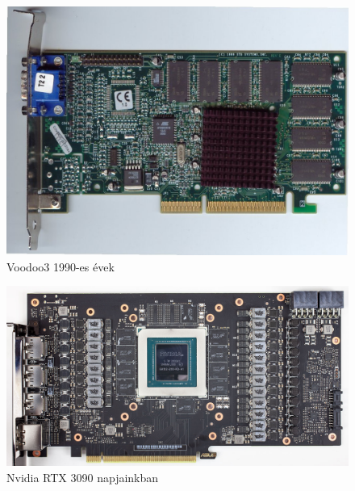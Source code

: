 \documentclass[tikz,border=10pt]{beamer}
\begin{document}
\begin{frame}
\begin{columns}[onlytextwidth]
\begin{column}{0.5\textwidth}
\begin{figure}
\includegraphics[scale=.15]{media/Voodoo3.jpg}
\caption{Voodoo3 1990-es évek}
\end{figure}

\begin{figure}
\includegraphics[scale=.078]{media/3080.jpg}
\caption{Nvidia RTX 3090 napjainkban}
\end{figure}

\end{column}
\end{columns}
\end{frame}
\end{document}
